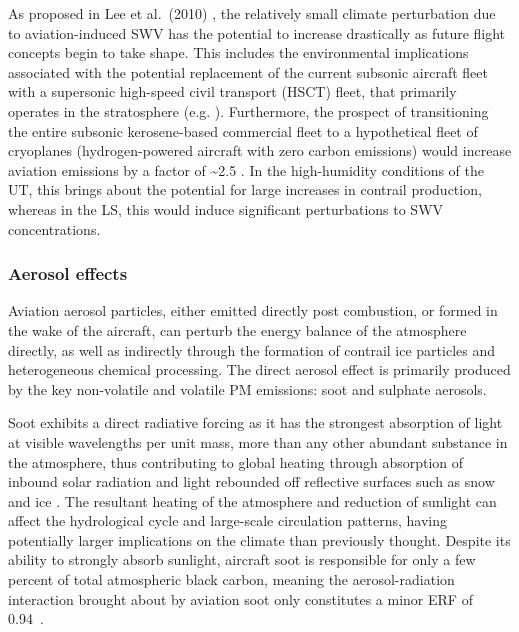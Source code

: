 As proposed in Lee et al.\ (2010) \cite{Lee2010}, the relatively small climate perturbation due to aviation-induced SWV has the potential to increase drastically as future flight concepts begin to take shape. This includes the environmental implications associated with the potential replacement of the current subsonic aircraft fleet with a supersonic high-speed civil transport (HSCT) fleet, that primarily operates in the stratosphere (e.g. \cite{MiakeLye1993, Danilin1994, Grooss1998, Kawa1999}). Furthermore, the prospect of transitioning the entire subsonic kerosene-based commercial fleet to a hypothetical fleet of cryoplanes (hydrogen-powered aircraft with zero carbon emissions) would increase aviation  emissions by a factor of \textasciitilde2.5 \cite{Gauss2003}. In the high-humidity conditions of the UT, this brings about the potential for large increases in contrail production, whereas in the LS, this would induce significant perturbations to SWV concentrations.


\subsubsection{Aerosol effects}
Aviation aerosol particles, either emitted directly post combustion, or formed in the wake of the aircraft, can perturb the energy balance of the atmosphere directly, as well as indirectly through the formation of contrail ice particles and heterogeneous chemical processing. The direct aerosol effect is primarily produced by the key non-volatile and volatile PM emissions: soot and sulphate aerosols.

Soot exhibits a direct radiative forcing as it has the strongest absorption of light at visible wavelengths per unit mass, more than any other abundant substance in the atmosphere, thus contributing to global heating through absorption of inbound solar radiation and light rebounded off reflective surfaces such as snow and ice \cite{Bond2013}. The resultant heating of the atmosphere and reduction of sunlight can affect the hydrological cycle and large-scale circulation patterns, having potentially larger implications on the climate than previously thought. Despite its ability to strongly absorb sunlight, aircraft soot is responsible for only a few percent of total atmospheric black carbon, meaning the aerosol-radiation interaction brought about by aviation soot only constitutes a minor ERF of 0.94~.

